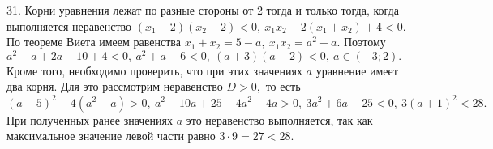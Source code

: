 31. Корни уравнения лежат по разные стороны от 2 тогда и только тогда, когда выполняется неравенство $(x_1-2)(x_2-2)<0,\ x_1x_2-2(x_1+x_2)+4<0.$ По теореме Виета имеем равенства $x_1+x_2=5-a,\ x_1x_2=a^2-a.$ Поэтому $a^2-a+2a-10+4<0,\
a^2+a-6<0,\ (a+3)(a-2)<0,\ a\in(-3;2).$ Кроме того, необходимо проверить, что при этих значениях $a$ уравнение имеет два корня. Для это рассмотрим неравенство $D>0,$ то есть $(a-5)^2-4(a^2-a)>0,\ a^2-10a+25-4a^2+4a>0,\ 3a^2+6a-25<0,\ 3(a+1)^2<28.$ При полученных ранее значениях $a$ это неравенство выполняется, так как максимальное значение левой части равно $3\cdot9=27<28.$\\
